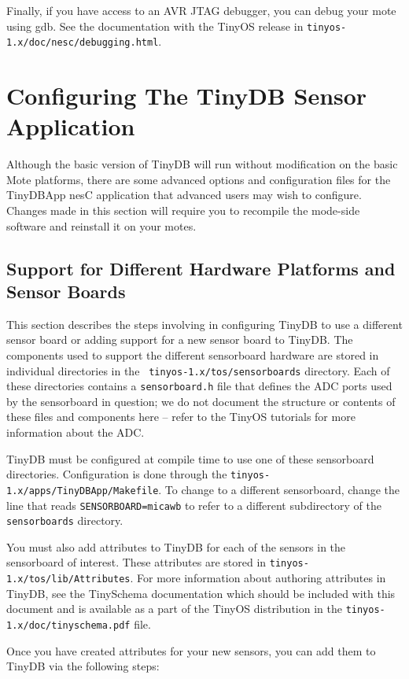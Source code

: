 \documentclass[11pt]{article}
\newcommand{\docroot}{tinyos-1.x}
\begin{document}
Finally, if you have access to an AVR JTAG debugger, you can debug your mote using
gdb.  See the documentation with the TinyOS release in {\tt \docroot/doc/nesc/debugging.html}.


\section{Configuring The TinyDB Sensor Application}

Although the basic version of TinyDB will run without modification on the basic Mote
platforms, there are some advanced options and configuration files for the TinyDBApp
nesC application that advanced users may wish to configure.  Changes made in this section
will require you to recompile the mode-side software and reinstall it on your motes.

\subsection{Support for Different Hardware Platforms and Sensor Boards}\label{sec:sb-config}

This section describes the steps involving in configuring TinyDB to
use a different sensor board or adding support for a new sensor board
to TinyDB.  The components used to support the different sensorboard
hardware are stored in individual directories in the {\tt
  \docroot/tos/sensorboards} directory.  Each of these directories
contains a {\tt sensorboard.h} file that defines the ADC ports used by
the sensorboard in question; we do not document the structure or
contents of these files and components here -- refer to the TinyOS
tutorials for more information about the ADC.

TinyDB must be configured at compile time to use one of these sensorboard
directories.  Configuration is done through the {\tt \docroot/apps/TinyDBApp/Makefile}.
To change to a different sensorboard, change the line that reads {\tt SENSORBOARD=micawb}
to refer to a different subdirectory of the {\tt sensorboards} directory.

You must also add attributes to TinyDB for each of the sensors in the sensorboard
of interest.  These attributes are stored in {\tt \docroot/tos/lib/Attributes}.
For more information about authoring attributes in TinyDB, see the TinySchema documentation
which should be included with this document and is available as a part of the TinyOS
distribution in the {\tt \docroot/doc/tinyschema.pdf} file.

Once you have created attributes for your new sensors, you can add them to TinyDB via the
following steps:
\end{document}
